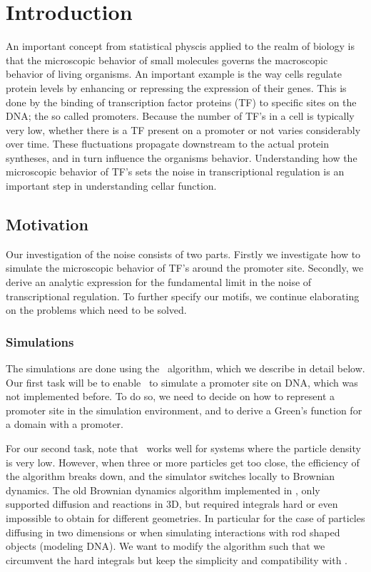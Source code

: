 \section{Introduction}

An important concept from statistical physcis applied to the realm of biology is that the microscopic behavior of small molecules governs the macroscopic behavior of living organisms. An important example is the way cells regulate protein levels by enhancing or repressing the expression of their genes. This is done by the binding of transcription factor proteins (TF) to specific sites on the DNA; the so called promoters. Because the number of TF's in a cell is typically very low, whether there is a TF present on a promoter or not varies considerably over time. These fluctuations propagate downstream to the actual protein syntheses, and in turn influence the organisms behavior. Understanding how the microscopic behavior of TF's sets the noise in transcriptional regulation is an important step in understanding cellar function.

\subsection{Motivation}
Our investigation of the noise consists of two parts. Firstly we investigate how to simulate the microscopic behavior of TF's around the promoter site. Secondly, we derive an analytic expression for the fundamental limit in the noise of transcriptional regulation. To further specify our motifs, we continue elaborating on the problems which need to be solved.

\subsubsection{Simulations}
The simulations are done using the \GFRD\, algorithm, which we describe in detail below. Our first task will be to enable \GFRD\, to simulate a promoter site on DNA, which was not implemented before. To do so, we need to decide on how to represent a promoter site in the simulation environment, and to derive a Green's function for a domain with a promoter. 

For our second task, note that \GFRD\, works well for systems where the particle density is very low. However, when three or more particles get too close, the efficiency of the algorithm breaks down, and the simulator switches locally to Brownian dynamics. The old Brownian dynamics algorithm implemented in \GFRD \cite{Morelli2008a}, only supported diffusion and reactions in 3D, but required integrals hard or even impossible to obtain for different geometries. In particular for the case of particles diffusing in two dimensions or when simulating interactions with rod shaped objects (modeling DNA). We want to modify the algorithm such that we circumvent the hard integrals but keep the simplicity and compatibility with \GFRD.

